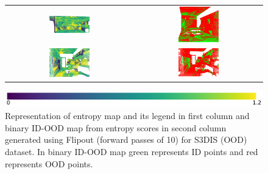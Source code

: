 \begin{figure}[h!]
\begin{tabular}{cc}
            \includegraphics[width=0.33\textwidth, height=0.18\textheight]{images/ood_imgs/fout_s3dis/pnt_1_fout_ent.pdf}& 
            \includegraphics[width=0.33\textwidth, height=0.18\textheight]{images/ood_imgs/fout_s3dis/fout_ent_3.pdf}\\

            \includegraphics[width=0.33\textwidth, height=0.18\textheight]{images/ood_imgs/fout_s3dis/ofc_42_fout_ent.pdf}& 
            \includegraphics[width=0.33\textwidth, height=0.18\textheight]{images/ood_imgs/fout_s3dis/fout_ent_1.pdf}\\
        \end{tabular}
        \includegraphics[scale=0.45]{images/ent_legend.pdf}
        \caption{Representation of entropy map and its legend in first column and binary ID-OOD map from entropy scores in second column generated using Flipout (forward passes of 10) for S3DIS (OOD) dataset. In binary ID-OOD map green represents ID points and red represents OOD points.}
        \label{fig:fout_s3dis_oodmap_ent}
    \end{figure}
    \FloatBarrier


